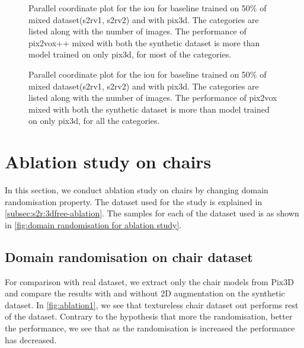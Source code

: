 \begin{figure}
    \centering
    \resizebox{0.7\textwidth}{!}{}
    \caption{Parallel coordinate plot for the \gls{iou} for baseline  trained on 50\% of mixed dataset(\gls{s2rv1}, \gls{s2rv2}) and with pix3d.
    The categories are listed along with the number of images.
    The performance of pix2vox++ mixed with both the synthetic dataset is more than model trained on only pix3d, for most of the categories.
    }
    \label{fig:mixed2}
\end{figure}

\begin{figure}
    \centering
    \resizebox{0.7\textwidth}{!}{}
    \caption{Parallel coordinate plot for the \gls{iou} for baseline  trained on 50\% of mixed dataset(\gls{s2rv1}, \gls{s2rv2}) and with pix3d.
    The categories are listed along with the number of images.
    The performance of pix2vox mixed with both the synthetic dataset is more than model trained on only pix3d, for all the categories.}
    \label{fig:mixed3}
\end{figure}

\section{Ablation study on chairs}\label{sec:ablation-study-on-chairs}
In this section, we conduct ablation study on chairs by changing domain randomisation property.
The dataset used for the study is explained in \autoref{subsec:s2r:3dfree-ablation}.
The samples for  each of the dataset used is as shown in \autoref{fig:domain randomisation for ablation study}.

\subsection{Domain randomisation on chair dataset}\label{subsec:domain-randomisation-on-chair-dataset}
For comparison with real dataset, we extract only the chair models from Pix3D and compare the results  with and without 2D augmentation on the synthetic dataset.
In \autoref{fig:ablation1}, we see that textureless chair dataset out performs rest of the dataset.
Contrary to the hypothesis that more the randomisation, better the performance, we see that as the randomisation is increased the performance has decreased.

